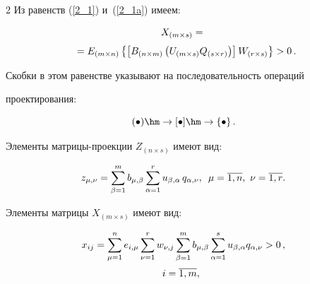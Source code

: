 \begin{multicols}{2}
Из равенств (\ref{2_1}) и~(\ref{2_1a}) имеем:


\begin{multline*}




X_{(m \times s)} = {}\\[3pt]


{}=E_{(m \times n)} \left\{\left[B_{(n \times m)} \left(U_{(m 


\times s)} Q_{(s \times r)}\right)\right] W_{(r \times s)}\right\} > 0\,.\hspace*{-3.59842pt}


\end{multline*}


Скобки в этом равенстве указывают на последовательность операций 


проектирования: 


$$


(\bullet) \hm\rightarrow [\bullet] \hm\rightarrow 


\left\{\bullet\right\}.


$$





Элементы матрицы-проекции $Z_{(n \times s)}$ имеют вид:


\begin{equation*}




z_{\mu,\nu} = \sum\limits^m_{\beta=1} b_{\mu,\beta} \sum\limits^r_{\alpha=1} 


u_{\beta,\alpha}\,q_{\alpha,\nu},\enskip \mu = \overline{1,n},\ \nu = 


\overline{1,r}.


\end{equation*}





Элементы матрицы $X_{(m \times s)}$ имеют вид:


\begin{multline}


\label{2_3}


x_{ij} = \sum\limits^n_{\mu=1} e_{i,\mu} \sum\limits^r_{\nu=1} w_{\nu,j} 


\sum\limits^m_{\beta=1} b_{\mu,\beta} \sum^s_{\alpha=1} u_{\beta,\alpha} 


q_{\alpha,\nu} > 0\,,\\[2pt] 


i = \overline{1,m},\enskip 



\end{multline}
\end{multicols}
